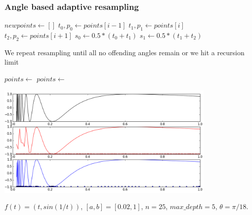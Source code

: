 \documentclass{beamer}
\begin{document}
\frametitle{Angle based adaptive resampling}
\begin{frame}
\footnotesize
\begin{algorithmic}[1]
\State $newpoints \gets []$
\State $t_0, p_0 \gets points[i-1]$
\State $t_1, p_1 \gets points[i]$
\State $t_2, p_2 \gets points[i+1]$
\State $s_0 \gets 0.5*(t_0 + t_1)$
\State $s_1 \gets 0.5*(t_1 + t_2)$
\State {}
\State {}
\State {}
\State {}
\EndIf
\EndFor
\State \Return {}
\EndFunction
\end{algorithmic}
\normalsize
\end{frame}

\begin{frame}
We repeat resampling until all no offending angles remain or we hit a recursion limit
\footnotesize
\begin{algorithmic}[1]
\State $points \gets$ 
\State $points \gets $
\EndFor
\end{algorithmic} \vspace{-0.3cm}
\pause
\begin{center}
\includegraphics[width=0.8\textwidth]{comparison.png} \\
\end{center}
$f(t) = (t, sin(1/t))$, $[a,b] = [0.02, 1]$, $n = 25$, $max\_depth = 5$, $\theta = \pi / 18$.
\normalsize
\end{frame}
\end{document}
